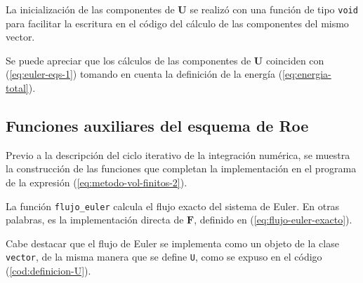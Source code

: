 La inicialización de las componentes de $\mathbf{{U}}$ se realizó con una función de tipo \texttt{void} para facilitar la escritura en el código del cálculo de las componentes del mismo vector.

Se puede apreciar que los cálculos de las componentes de $\mathbf{{U}}$ coinciden con (\ref{eq:euler-eqs-1}) tomando en cuenta la definición de la energía (\ref{eq:energia-total}).
\subsection{Funciones auxiliares del esquema de Roe}
Previo a la descripción del ciclo iterativo de la integración numérica, se muestra la construcción de las funciones que completan la implementación en el programa de la expresión (\ref{eq:metodo-vol-finitos-2}).

La función \texttt{flujo\_euler} calcula el flujo exacto del sistema de Euler. En otras palabras, es la implementación directa de $\mathbf{{F}}$, definido en (\ref{eq:flujo-euler-exacto}).

Cabe destacar que el flujo de Euler se implementa como un objeto de la clase \texttt{vector}, de la misma manera que se define \texttt{U}, como se expuso en el código (\ref{cod:definicion-U}).

